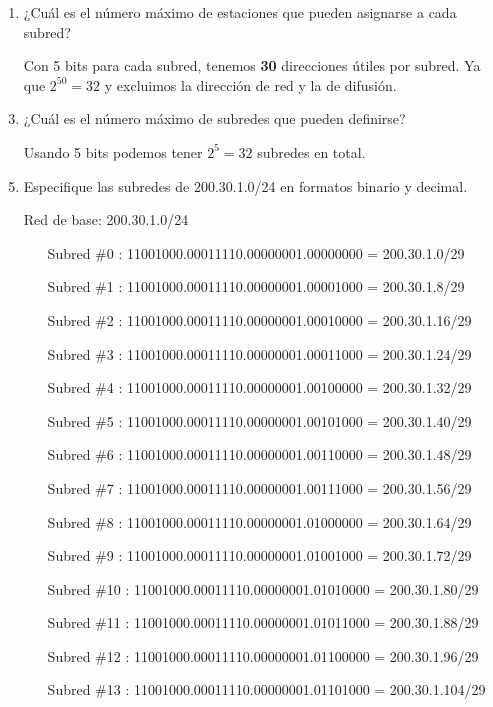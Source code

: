 \begin{enumerate}
\begin{enumerate}
        \item ¿Cu\'al es el n\'umero m\'aximo de estaciones que pueden asignarse a cada subred?
        \item[] Con 5 bits para cada subred, tenemos \textbf{30} direcciones \'utiles por subred. Ya que \(2^50=32\)
        y excluimos la direcci\'on de red y la de difusi\'on.

        \item ¿Cu\'al es el n\'umero m\'aximo de subredes que pueden definirse?
        \item[] Usando 5 bits podemos tener \(2^5=32\) subredes en total.
    
        \item Especifique las subredes de 200.30.1.0/24 en formatos binario y decimal.
        \item[] Red de base: 200.30.1.0/24
        \begin{enumerate}
            \item[Subred \#0] : 11001000.00011110.00000001.00000000 = 200.30.1.0/29
            \item[Subred \#1] : 11001000.00011110.00000001.00001000 = 200.30.1.8/29
            \item[Subred \#2] : 11001000.00011110.00000001.00010000 = 200.30.1.16/29
            \item[Subred \#3] : 11001000.00011110.00000001.00011000 = 200.30.1.24/29
            \item[Subred \#4] : 11001000.00011110.00000001.00100000 = 200.30.1.32/29
            \item[Subred \#5] : 11001000.00011110.00000001.00101000 = 200.30.1.40/29
            \item[Subred \#6] : 11001000.00011110.00000001.00110000 = 200.30.1.48/29
            \item[Subred \#7] : 11001000.00011110.00000001.00111000 = 200.30.1.56/29
            \item[Subred \#8] : 11001000.00011110.00000001.01000000 = 200.30.1.64/29
            \item[Subred \#9] : 11001000.00011110.00000001.01001000 = 200.30.1.72/29
            \item[Subred \#10] : 11001000.00011110.00000001.01010000 = 200.30.1.80/29
            \item[Subred \#11] : 11001000.00011110.00000001.01011000 = 200.30.1.88/29
            \item[Subred \#12] : 11001000.00011110.00000001.01100000 = 200.30.1.96/29
            \item[Subred \#13] : 11001000.00011110.00000001.01101000 = 200.30.1.104/29

\end{enumerate}
\end{enumerate}
\end{enumerate}
